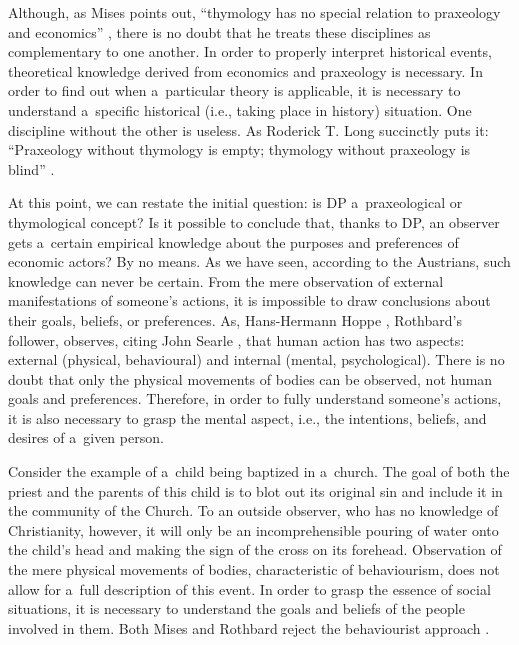 Although, as Mises points out, ``thymology has no special relation to praxeology and economics'' 
\parencite[][p.271]{mises_theory_2007}, %
 there is no doubt that he treats these disciplines as complementary to one another. In order to properly interpret historical events, theoretical knowledge derived from economics and praxeology is necessary. In order to find out when a~particular theory is applicable, it is necessary to understand a~specific historical (i.e., taking place in history) situation. One discipline without the other is useless. As Roderick T. Long succinctly puts it: ``Praxeology without thymology is empty; thymology without praxeology is blind'' 
\parencite[][p.50]{long_wittgenstein_2008}.%




At this point, we can restate the initial question: is DP a~praxeological or thymological concept? Is it possible to conclude that, thanks to DP, an observer gets a~certain empirical knowledge about the purposes and preferences of economic actors? By no means. As we have seen, according to the Austrians, such knowledge can never be certain. From the mere observation of external manifestations of someone's actions, it is impossible to draw conclusions about their goals, beliefs, or preferences. As, Hans-Hermann Hoppe 
\parencite*[][]{hoppe_note_2005}, %
 Rothbard's follower, observes, citing John Searle 
\parencite*[][pp.57–58]{searle_minds_1984}, %
 that human action has two aspects: external (physical, behavioural) and internal (mental, psychological). There is no doubt that only the physical movements of bodies can be observed, not human goals and preferences. Therefore, in order to fully understand someone's actions, it is also necessary to grasp the mental aspect, i.e., the intentions, beliefs, and desires of a~given person.



Consider the example of a~child being baptized in a~church. The goal of both the priest and the parents of this child is to blot out its original sin and include it in the community of the Church. To an outside observer, who has no knowledge of Christianity, however, it will only be an incomprehensible pouring of water onto the child's head and making the sign of the cross on its forehead. Observation of the mere physical movements of bodies, characteristic of behaviourism, does not allow for a~full description of this event. In order to grasp the essence of social situations, it is necessary to understand the goals and beliefs of the people involved in them. Both Mises and Rothbard reject the behaviourist approach 
\parencites[cf.][]{mises_theory_2007}[][]{rothbard_present_2011}.%




